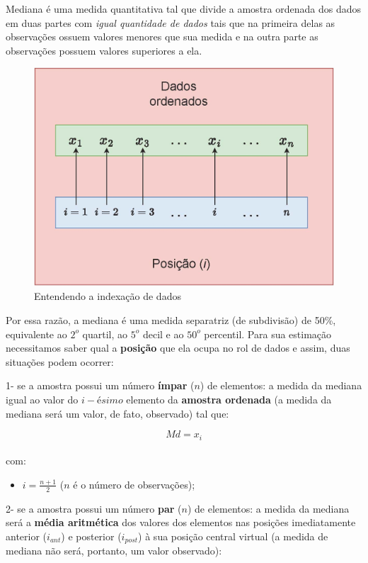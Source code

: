 \documentclass[
]{book}
\providecommand{\tightlist}{%
  \setlength{\itemsep}{0pt}\setlength{\parskip}{0pt}}
\begin{document}
\hfill\break

Mediana é uma medida quantitativa tal que divide a amostra ordenada dos dados em duas partes com \emph{igual quantidade de dados} tais que na primeira delas as observações ossuem valores menores que sua medida e na outra parte as observações possuem valores superiores a ela.

\hfill\break

\begin{figure}

{\centering \includegraphics[width=0.5\linewidth]{images3/vetor_posicao} 

}

\caption{Entendendo a indexação de dados}\label{fig:unnamed-chunk-24}
\end{figure}

\hfill\break

Por essa razão, a mediana é uma medida separatriz (de subdivisão) de 50\%, equivalente ao \(2^{o}\) quartil, ao \(5^{o}\) decil e ao \(50^{o}\) percentil. Para sua estimação necessitamos saber qual a \textbf{posição} que ela ocupa no rol de dados e assim, duas situações podem ocorrer:

\hfill\break

1- se a amostra possui um número \textbf{ímpar} (\(n\)) de elementos: a medida da mediana igual ao valor do \(i-ésimo\) elemento da \textbf{amostra ordenada} (a medida da mediana será um valor, de fato, observado) tal que:

\[
Md=x_{i} 
\]\\

com:

\begin{itemize}
\tightlist
\item
  \(i=\frac{n+1}{2}\) (\(n\) é o número de observações);
\end{itemize}

\hfill\break

2- se a amostra possui um número \textbf{par} (\(n\)) de elementos: a medida da mediana será a \textbf{média aritmética} dos valores dos elementos nas posições imediatamente anterior (\(i_{ant}\)) e posterior (\(i_{post}\)) à sua posição central virtual (a medida de mediana não será, portanto, um valor observado):
\end{document}
